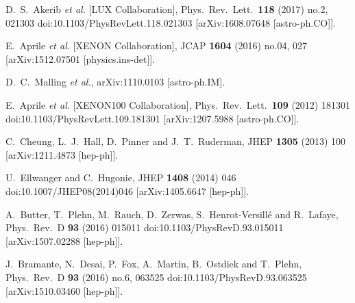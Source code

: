\documentclass[12pt,twoside]{article}
\begin{document}
\begin{thebibliography}{99}

  D.~S.~Akerib {\it et al.} [LUX Collaboration],
  Phys.\ Rev.\ Lett.\  {\bf 118} (2017) no.2,  021303
  doi:10.1103/PhysRevLett.118.021303
  [arXiv:1608.07648 [astro-ph.CO]].

  E.~Aprile {\it et al.} [XENON Collaboration],
  JCAP {\bf 1604} (2016) no.04,  027
  [arXiv:1512.07501 [physics.ins-det]].

  D.~C.~Malling {\it et al.},
  arXiv:1110.0103 [astro-ph.IM].
  
  E.~Aprile {\it et al.} [XENON100 Collaboration],
  Phys.\ Rev.\ Lett.\  {\bf 109} (2012) 181301
  doi:10.1103/PhysRevLett.109.181301
  [arXiv:1207.5988 [astro-ph.CO]].

  C.~Cheung, L.~J.~Hall, D.~Pinner and J.~T.~Ruderman,
  JHEP {\bf 1305} (2013) 100
  [arXiv:1211.4873 [hep-ph]].
  

  U.~Ellwanger and C.~Hugonie,
  JHEP {\bf 1408} (2014) 046
  doi:10.1007/JHEP08(2014)046
  [arXiv:1405.6647 [hep-ph]].
  
  A.~Butter, T.~Plehn, M.~Rauch, D.~Zerwas, S.~Henrot-Versillé and R.~Lafaye,
  Phys.\ Rev.\ D {\bf 93} (2016) 015011
  doi:10.1103/PhysRevD.93.015011
  [arXiv:1507.02288 [hep-ph]].

  J.~Bramante, N.~Desai, P.~Fox, A.~Martin, B.~Ostdiek and T.~Plehn,
  Phys.\ Rev.\ D {\bf 93} (2016) no.6,  063525
  doi:10.1103/PhysRevD.93.063525
  [arXiv:1510.03460 [hep-ph]].
  

\end{thebibliography}
\end{document}
